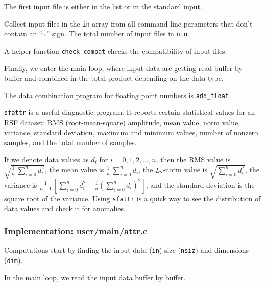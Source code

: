 The first input file is either in the list or in the standard input.

Collect input files in the \texttt{in} array from all command-line
parameters that don't contain an ``\texttt{=}'' sign. The total number
of input files in \texttt{nin}.

A helper function \texttt{check\_compat} checks the compatibility of
input files.

Finally, we enter the main loop, where input data are getting read
buffer by buffer and combined in the total product depending on the
data type.

The data combination program for floating point numbers is
\texttt{add\_float}.  

\noindent\doublebox{\parbox{\textwidth}{

}}

\texttt{sfattr} is a useful diagnostic program. It reports certain
statistical values for an RSF dataset: RMS (root-mean-square)
amplitude, mean value, norm value, variance, standard deviation,
maximum and minimum values, number of nonzero samples, and the total
number of samples.

If we denote data values as $d_i$ for $i=0,1,2,\ldots,n$, then the RMS
value is $\sqrt{\frac{1}{n}\,\sum\limits_{i=0}^n d_i^2}$, the mean
value is $\frac{1}{n}\,\sum\limits_{i=0}^n d_i$, the $L_2$-norm value
is $\sqrt{\sum\limits_{i=0}^n d_i^2}$, the variance is
$\frac{1}{n-1}\,\left[\sum\limits_{i=0}^n d_i^2 - \frac{1}{n}\left(\sum\limits_{i=0}^n d_i\right)^2\right]$, and the standard
deviation is the square root of the variance. Using \texttt{sfattr}
is a quick way to see the distribution of data values and check it for
anomalies.

\subsubsection{Implementation: \href{http://rsf.svn.sourceforge.net/viewvc/rsf/trunk/user/main/attr.c?view=markup}{user/main/attr.c}}

Computations start by finding the input data (\texttt{in}) size
(\texttt{nsiz}) and dimensions (\texttt{dim}).

In the main loop, we read the input data buffer by buffer.

